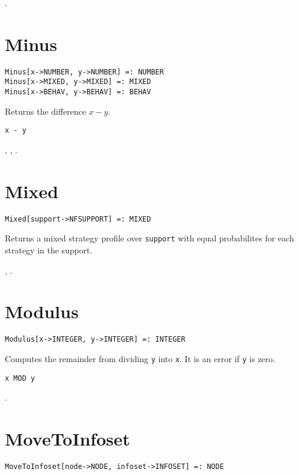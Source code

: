 \seealso {}.


\section*{Minus}\label{PrimMinus}
\begin{verbatim}
Minus[x->NUMBER, y->NUMBER] =: NUMBER 
Minus[x->MIXED, y->MIXED] =: MIXED 
Minus[x->BEHAV, y->BEHAV] =: BEHAV 
\end{verbatim}

\noindent
Returns the difference $x - y$.

\shortform \verb+x - y+

\seealso {},
, .


\section*{Mixed}\label{PrimMixed}
\begin{verbatim}
Mixed[support->NFSUPPORT] =: MIXED 
\end{verbatim}

\noindent
Returns a mixed strategy profile over \verb+support+ with equal
probabilites for each strategy in the support.  

\seealso {}, 
.


\section*{Modulus}\label{PrimModulus}
\begin{verbatim}
Modulus[x->INTEGER, y->INTEGER] =: INTEGER 
\end{verbatim}

\noindent
Computes the remainder from dividing \verb+y+ into \verb+x+.  It is an
error if \verb+y+ is zero.

\shortform \verb+x MOD y+

\seealso {}.


\section*{MoveToInfoset}\label{PrimMoveToInfoset}
\begin{verbatim}
MoveToInfoset[node->NODE, infoset->INFOSET] =: NODE 
\end{verbatim}

